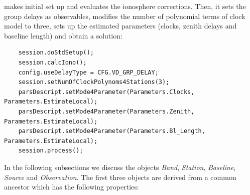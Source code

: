 \documentclass [10pt,letterpaper]{report}
\begin{document}
makes initial set up and evaluates the ionosphere corrections. Then, it sets the group delays as observables,
modifies the number of polynomial terms of clock model to three, sets up the estimated parameters (clocks,
zenith delays and baseline length) and obtain a solution:
{\small\begin{verbatim}
    session.doStdSetup();
    session.calcIono();
    config.useDelayType = CFG.VD_GRP_DELAY;
    session.setNumOfClockPolynoms4Stations(3);
    parsDescript.setMode4Parameter(Parameters.Clocks,    Parameters.EstimateLocal);
    parsDescript.setMode4Parameter(Parameters.Zenith,    Parameters.EstimateLocal);
    parsDescript.setMode4Parameter(Parameters.Bl_Length, Parameters.EstimateLocal);
    session.process();
\end{verbatim}}

In the following subsections we discuss the objects {\sl Band}, {\sl Station}, {\sl Baseline},
{\sl Source} and {\sl Observation}. The first three objects are derived from a common ancestor
which has the following properties:
\end{document}

